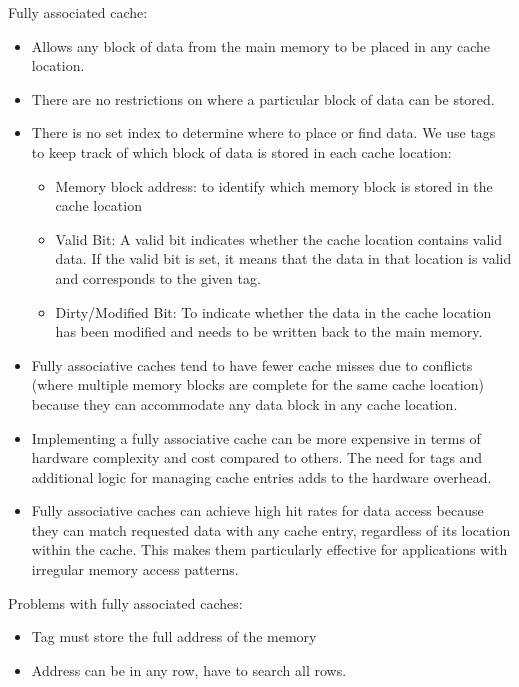 \documentclass[letterpaper,12pt]{article}
\begin{document}
Fully associated cache:
\begin{itemize}
    \item Allows any block of data from the main memory to be placed in any cache location.
    \item There are no restrictions on where a particular block of data can be stored.
    \item There is no set index to determine where to place or find data. We use tags to keep track of which block of data is stored in each cache location:
          \begin{itemize}
              \item Memory block address: to identify which memory block is stored in the cache location
              \item Valid Bit: A valid bit indicates whether the cache location contains valid data. If the valid bit is set, it means that the data in that location is valid and corresponds to the given tag.
              \item Dirty/Modified Bit: To indicate whether the data in the cache location has been modified and needs to be written back to the main memory.
          \end{itemize}
    \item Fully associative caches tend to have fewer cache misses due to conflicts (where multiple memory blocks are complete for the same cache location) because they can accommodate any data block in any cache location.
    \item Implementing a fully associative cache can be more expensive in terms of hardware complexity and cost compared to others. The need for tags and additional logic for managing cache entries adds to the hardware overhead.
    \item Fully associative caches can achieve high hit rates for data access because they can match requested data with any cache entry, regardless of its location within the cache. This makes them particularly effective for applications with irregular memory access patterns.
\end{itemize}

Problems with fully associated caches:

\begin{itemize}
    \item Tag must store the full address of the memory
    \item Address can be in any row, have to search all rows.
\end{itemize}
\end{document}
